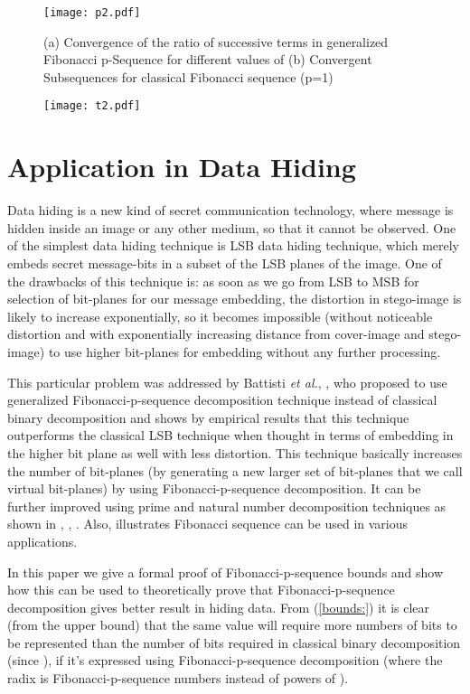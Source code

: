 \documentclass{ijcsa}
\begin{document}
\begin{figure}[htbp]
	\label{fig:f2}
	\centering
		\texttt{[image: p2.pdf]}
	\caption{(a) Convergence of the ratio of successive terms in generalized Fibonacci p-Sequence for different values of 
					 (b) Convergent Subsequences for classical Fibonacci sequence (p=1)}
\end{figure}

\begin{figure}[htbp]
	\label{fig:t2}
	\centering
		\texttt{[image: t2.pdf]}
\end{figure}

\section{Application in Data Hiding}
\par Data hiding is a new kind of secret communication technology, where message is hidden inside 
an image or any other medium, so that it cannot be observed. One of the simplest data hiding technique
is LSB data hiding technique, which merely embeds secret message-bits in a subset of the LSB planes of 
the image. One of the drawbacks of this technique is: as soon as we go from LSB to MSB for selection of 
bit-planes for our message embedding, the distortion in stego-image is likely to increase
exponentially, so it becomes impossible (without noticeable distortion and with exponentially increasing 
distance from cover-image and stego-image) to use higher bit-planes for embedding without any further 
processing.

\par This particular problem was addressed by Battisti {\it et al.}, \cite{battisti06}, who proposed to use generalized 
Fibonacci-p-sequence decomposition technique instead of classical binary decomposition and shows by empirical 
results that this technique outperforms the classical LSB technique when thought in terms of embedding in the 
higher bit plane as well with less distortion. This technique basically increases the number of bit-planes (by generating
a new larger set of bit-planes that we call virtual bit-planes) by using Fibonacci-p-sequence decomposition. It can 
be further improved using prime and natural number decomposition techniques as shown in \cite{dey07a}, \cite{dey07b}, 
\cite{dey08}. Also, \cite{cooper84} \cite{dotson93} illustrates Fibonacci sequence can be used in various applications.

\par In this paper we give a formal proof of Fibonacci-p-sequence bounds and show how this can be used to theoretically 
prove that Fibonacci-p-sequence decomposition gives better result in hiding data. From (\ref{bounds:}) it is clear 
(from the upper bound) that the same value will require more numbers of bits to be represented than the number of bits required in classical binary decomposition (since ), if it's expressed using Fibonacci-p-sequence decomposition (where the radix is Fibonacci-p-sequence numbers instead of powers of ). \\
\end{document}
